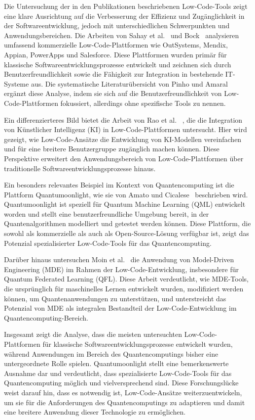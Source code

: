 Die Untersuchung der in den Publikationen beschriebenen Low-Code-Tools zeigt eine klare Ausrichtung auf die Verbesserung der 
Effizienz und Zugänglichkeit in der Softwareentwicklung, jedoch mit unterschiedlichen Schwerpunkten und Anwendungsbereichen. 
Die Arbeiten von Sahay et al.~\cite{Sahay_2020} und Bock~\cite{Bock_2021_essence} analysieren umfassend kommerzielle 
Low-Code-Plattformen wie OutSystems, Mendix, Appian, PowerApps und Salesforce. Diese Plattformen wurden primär für klassische 
Softwareentwicklungsprozesse entwickelt und zeichnen sich durch Benutzerfreundlichkeit sowie die Fähigkeit zur Integration in 
bestehende IT-Systeme aus. Die systematische Literaturübersicht von Pinho und Amaral~\cite{Pinho_2022} ergänzt diese 
Analyse, indem sie sich auf die Benutzerfreundlichkeit von Low-Code-Plattformen fokussiert, allerdings ohne spezifische Tools 
zu nennen.

Ein differenzierteres Bild bietet die Arbeit von Rao et al. ~\cite{rao2024}, die die Integration von Künstlicher Intelligenz 
(KI) in Low-Code-Plattformen untersucht. Hier wird gezeigt, wie Low-Code-Ansätze die Entwicklung von KI-Modellen vereinfachen und 
für eine breitere Benutzergruppe zugänglich machen können. Diese Perspektive erweitert den Anwendungsbereich von Low-Code-Plattformen 
über traditionelle Softwareentwicklungsprozesse hinaus.

Ein besonders relevantes Beispiel im Kontext von Quantencomputing ist die Plattform Quantumoonlight, wie sie von Amato und 
Cicalese~\cite{Amato_2023} beschrieben wird. Quantumoonlight ist speziell für Quantum Machine Learning (QML) entwickelt worden 
und stellt eine benutzerfreundliche Umgebung bereit, in der Quantenalgorithmen modelliert und getestet werden können. Diese 
Plattform, die sowohl als kommerzielle als auch als Open-Source-Lösung verfügbar ist, zeigt das Potenzial spezialisierter 
Low-Code-Tools für das Quantencomputing.

Darüber hinaus untersuchen Moin et al.~\cite{Moin_2023} die Anwendung von Model-Driven Engineering (MDE) im Rahmen der 
Low-Code-Entwicklung, insbesondere für Quantum Federated Learning (QFL). Diese Arbeit verdeutlicht, wie MDE-Tools, die 
ursprünglich für maschinelles Lernen entwickelt wurden, modifiziert werden können, um Quantenanwendungen zu unterstützen, und 
unterstreicht das Potenzial von MDE als integralen Bestandteil der Low-Code-Entwicklung im Quantencomputing-Bereich.

Insgesamt zeigt die Analyse, dass die meisten untersuchten Low-Code-Plattformen für klassische Softwareentwicklungsprozesse 
entwickelt wurden, während Anwendungen im Bereich des Quantencomputings bisher eine untergeordnete Rolle spielen. Quantumoonlight 
stellt eine bemerkenswerte Ausnahme dar und verdeutlicht, dass spezialisierte Low-Code-Tools für das Quantencomputing möglich 
und vielversprechend sind. Diese Forschungslücke weist darauf hin, dass es notwendig ist, Low-Code-Ansätze weiterzuentwickeln, um 
sie für die Anforderungen des Quantencomputings zu adaptieren und damit eine breitere Anwendung dieser Technologie zu ermöglichen.

